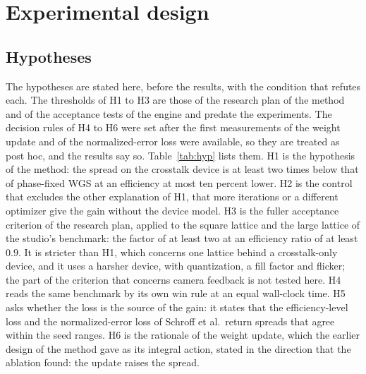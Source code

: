 \section{Experimental design}\label{sec:design}

\subsection{Hypotheses}

The hypotheses are stated here, before the results, with the condition that refutes each. The thresholds of H1 to H3 are those of the research plan of the method and of the acceptance tests of the engine and predate the experiments. The decision rules of H4 to H6 were set after the first measurements of the weight update and of the normalized-error loss were available, so they are treated as post hoc, and the results say so. Table~\ref{tab:hyp} lists them. H1 is the hypothesis of the method: the spread on the crosstalk device is at
least two times below that of phase-fixed WGS at an efficiency at most ten percent lower. H2 is the control that excludes the other explanation of H1, that more iterations or a different optimizer give the gain without the device model. H3 is the fuller acceptance criterion of the research plan, applied to the square lattice and the large lattice of the studio's benchmark: the factor of at least two at an
efficiency ratio of at least $0.9$. It is stricter than H1, which concerns one lattice behind a crosstalk-only device, and it uses a harsher device, with quantization, a fill factor and flicker; the part of the criterion that concerns camera feedback is not tested here. H4 reads the same benchmark by its own win rule at an equal wall-clock time. H5 asks whether the loss is the source of the gain: it states that the efficiency-level loss and the normalized-error loss of Schroff et al.\ return spreads that agree within the seed ranges. H6 is the rationale of the weight update, which the earlier design of the method gave as its integral action, stated in the direction that the ablation found: the update raises the spread.

